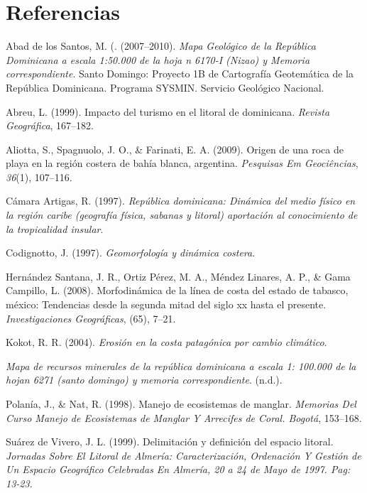 \documentclass[11pt,]{article}
\begin{document}
\section*{Referencias}\label{referencias}

\hypertarget{refs}{}
\hypertarget{ref-abad2007mapageonizao}{}
Abad de los Santos, M. (. (2007--2010). \emph{Mapa Geológico de la
República Dominicana a escala 1:50.000 de la hoja n 6170-I (Nizao) y
Memoria correspondiente}. Santo Domingo: Proyecto 1B de Cartografía
Geotemática de la República Dominicana. Programa SYSMIN. Servicio
Geológico Nacional.

\hypertarget{ref-abreu1999impacto}{}
Abreu, L. (1999). Impacto del turismo en el litoral de dominicana.
\emph{Revista Geográfica}, 167--182.

\hypertarget{ref-aliotta2009origen}{}
Aliotta, S., Spagnuolo, J. O., \& Farinati, E. A. (2009). Origen de una
roca de playa en la región costera de bahía blanca, argentina.
\emph{Pesquisas Em Geociências}, \emph{36}(1), 107--116.

\hypertarget{ref-camara1997republica}{}
Cámara Artigas, R. (1997). \emph{República dominicana: Dinámica del
medio físico en la región caribe (geografía física, sabanas y litoral)
aportación al conocimiento de la tropicalidad insular}.

\hypertarget{ref-codignotto1997geomorfologia}{}
Codignotto, J. (1997). \emph{Geomorfología y dinámica costera}.

\hypertarget{ref-hernandez2008morfodinamica}{}
Hernández Santana, J. R., Ortiz Pérez, M. A., Méndez Linares, A. P., \&
Gama Campillo, L. (2008). Morfodinámica de la línea de costa del estado
de tabasco, méxico: Tendencias desde la segunda mitad del siglo xx hasta
el presente. \emph{Investigaciones Geográficas}, (65), 7--21.

\hypertarget{ref-kokot2004erosion}{}
Kokot, R. R. (2004). \emph{Erosión en la costa patagónica por cambio
climático}.

\hypertarget{ref-diaz2007memoria}{}
\emph{Mapa de recursos minerales de la república dominicana a escala 1:
100.000 de la hojan 6271 (santo domingo) y memoria correspondiente}.
(n.d.).

\hypertarget{ref-polania1998manejo}{}
Polanía, J., \& Nat, R. (1998). Manejo de ecosistemas de manglar.
\emph{Memorias Del Curso Manejo de Ecosistemas de Manglar Y Arrecifes de
Coral. Bogotá}, 153--168.

\hypertarget{ref-suarez1999delimitacion}{}
Suárez de Vivero, J. L. (1999). Delimitación y definición del espacio
litoral. \emph{Jornadas Sobre El Litoral de Almería: Caracterización,
Ordenación Y Gestión de Un Espacio Geográfico Celebradas En Almería, 20
a 24 de Mayo de 1997. Pag: 13-23}.




\newpage
\singlespacing 
\end{document}
